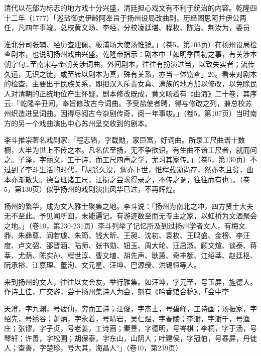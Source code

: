 清代以花部为标志的地方戏十分兴盛，清廷担心戏文有不利于统治的内容。乾隆四十二年（1777）「巡盐御史伊龄阿奉旨于扬州设局改曲剧，历经图思阿并伊公两任，凡四年事竣。总校黄文旸、李经，分校凌廷堪、程枚、陈治、荆汝为，委员


\noindent 淮北分司张辅、经历查建佩、板浦场大使汤惟镜。」（卷5，第103页）在扬州设局检查剧本，也说明扬州戏曲兴盛。乾隆帝指示：剧本中「如明季国初之事，有关涉本朝字句…至南宋与金朝关涉词曲，外间剧本，往往有扮演过当，以致失实者；流传久远，无识之徒，或至转以剧本为真，殊有关系，亦当一体饬查」26。看来对剧本的检查，主要出于民族关系，即把汉人斥责女真、满族的地方加以修改，以免除民人对清朝的正统地位产生怀疑。剧本修改既成，黄文旸着有《曲海》二十卷，其序云:「乾隆辛丑间，奉旨修改古今词曲。予受盐使者聘，得与修改之列，兼总校苏州织造进呈词曲。因得尽阅古今杂剧传奇，阅一年事竣。」（卷5，第107页）当时南方的另一个戏曲演出中心苏州呈交收到的剧本。

李斗推崇著名戏剧家:「程志辂，字载勋，家巨富，好词曲。所录工尺曲谱十数橱，大半为世上不传之本。凡名优至扬，无不争欲识。有生曲不谙工尺者，就而问之。子泽，字丽文，工于诗，而工尺四声之学，尤习其家传。」（卷5，第130页）不过到了李斗生活的时代，「胡翁久没，詹亦下世，惟程载勋尚存，然亦老且贫，曲本亦渐散失。德音班诸工尺，汪损之尝求得录之，不传之调，往往而有也」。（卷5，第130页）似乎扬州的戏剧演出风华已过，不再辉煌。


扬州的繁华，成为文人雅士聚集之地。李斗说：「扬州为南北之冲，四方贤士大夫无不至此。予见闻所囿，未能遍记。有游迹数至而无专主之家，以虹桥为文酒聚会之地。」（卷10，第230-231页）李斗列举了记忆所及到过扬州学者文人，有梅文鼎、朱彝尊、阎若璩、朱筠、钱大昕、王昶、沈初、袁枚、王鸣盛、金榜、李汪度、卢文弨、邵晋涵、陆师、张书勋、钮玉、周大纶、汪启淑、顾文煊、谈泰、蒋莘、尤荫、陈实孙、程世淳、曹文埴、胡先声、耿蕙、奇丰额、江绍莘、赵廷枢、阮承裕、江嘉理、董洵、文元星、汪坤、巴源绶、洪锡恒等人。

来到扬州的文人，往往以文会友，举行雅集。如汪坤，字元至，号玉屏，旌德人。作诗上佳，广交游，尝于扬州集诗人为会，刻有《吟香馆合稿》。「会中李

\vfill
\begin{BookNotes}
\end{BookNotes}

\noindent 天澄，字九渊，号疲仙，穷而工诗；汪俊，字杰士，号碧峰，工诗画；汤振家，字绍先，号绣谷；萧炳，字永着，号晴岩，吴仁煜，字春陵；李澍，字澍千，号渔庄；张镠，字子贞，号老姜，工诗画；秦昱，字德明，号岑棋；李桐，字于汤，号琴轩；许善，字松圃；胡保泰，字东山，山阴人；叶建侯，字冠伯，号春屏，丹徒人；查善，字楚珍，号大其，海昌人°」（卷10，第239页）

